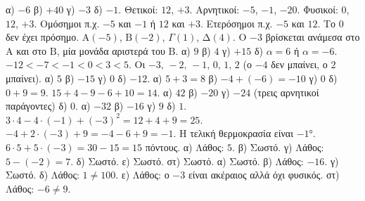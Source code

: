  α) $-6$ \quad β) $+40$ \quad γ) $-3$ \quad δ) $-1$.
 Θετικοί: $12$, $+3$. Αρνητικοί: $-5$, $-1$, $-20$. Φυσικοί: $0$, $12$, $+3$. Ομόσημοι π.χ. $-5$ και $-1$ ή $12$ και $+3$. Ετερόσημοι π.χ. $-5$ και $12$. Το $0$ δεν έχει πρόσημο.
 $\mathrm{Α}(-5)$, $\mathrm{Β}(-2)$, $\Gamma(1)$, $\mathrm{Δ}(4)$. Ο $-3$ βρίσκεται ανάμεσα στο $\mathrm{Α}$ και στο $\mathrm{Β}$, μία μονάδα αριστερά του $\mathrm{Β}$.
 α) $9$ \quad β) $4$ \quad γ) $+15$ \quad δ) $\alpha=6$ ή $\alpha=-6$.
 $-12<-7<-1<0<3<5$.
 Οι $-3,\,-2,\,-1,\,0,\,1,\,2$ (ο $-4$ δεν μπαίνει, ο $2$ μπαίνει).
 α) $5$ \quad β) $-15$ \quad γ) $0$ \quad δ) $-12$.
 α) $5+3=8$ \quad β) $-4+(-6)=-10$ \quad γ) $0$ \quad δ) $0+9=9$.
 $15+4-9-6+10=14$.
 α) $42$ \quad β) $-20$ \quad γ) $-24$ (τρεις αρνητικοί παράγοντες) \quad δ) $0$.
 α) $-32$ \quad β) $-16$ \quad γ) $9$ \quad δ) $1$.
 $3\cdot4-4\cdot(-1)+(-3)^2=12+4+9=25$.
 $-4+2\cdot(-3)+9=-4-6+9=-1$. Η τελική θερμοκρασία είναι $-1$°.
 $6\cdot5+5\cdot(-3)=30-15=15$ πόντους.
 α) Λάθος: $5$. β) Σωστό. γ) Λάθος: $5-(-2)=7$. δ) Σωστό. ε) Σωστό. στ) Σωστό.
 α) Σωστό. β) Λάθος: $-16$. γ) Σωστό. δ) Λάθος: $1\neq100$. ε) Λάθος: ο $-3$ είναι ακέραιος αλλά όχι φυσικός. στ) Λάθος: $-6\neq9$.
